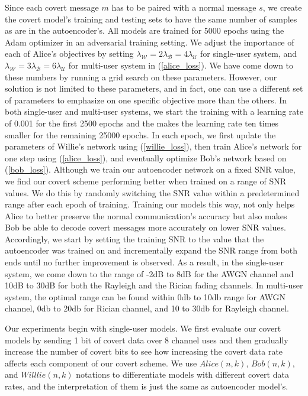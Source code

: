 Since each covert message \(m\) has to be paired with a normal message \(s\), we create the covert model's training and testing sets to have the same number of samples as are in the autoencoder's. All models are trained for 5000 epochs using the Adam optimizer in an adversarial training setting. We adjust the importance of each of Alice's objectives by setting \(\lambda_{\mathcal{W}} = 2 \lambda_{\mathcal{B}} = 4 \lambda_{\mathcal{U}}\) for single-user system, and \(\lambda_{\mathcal{W}} = 3 \lambda_{\mathcal{B}} = 6 \lambda_{\mathcal{U}}\) for multi-user system in (\ref{alice_loss}). We have come down to these numbers by running a grid search on these parameters. However, our solution is not limited to these parameters, and in fact, one can use a different set of parameters to emphasize on one specific objective more than the others. In both single-user and multi-user systems, we start the training with a learning rate of 0.001 for the first 2500 epochs and the makes the learning rate ten times smaller for the remaining 25000 epochs. In each epoch, we first update the parameters of Willie's network using (\ref{willie_loss}), then train Alice's network for one step using (\ref{alice_loss}), and eventually optimize Bob's network based on (\ref{bob_loss}). Although we train our autoencoder network on a fixed SNR value, we find our covert scheme performing better when trained on a range of SNR values. We do this by randomly switching the SNR value within a predetermined range after each epoch of training. Training our models this way, not only helps Alice to better preserve the normal communication's accuracy but also makes Bob be able to decode covert messages more accurately on lower SNR values. Accordingly, we start by setting the training SNR to the value that the autoencoder was trained on and incrementally expand the SNR range from both ends until no further improvement is observed. As a result, in the single-user system, we come down to the range of -2dB to 8dB for the AWGN channel and 10dB to 30dB for both the Rayleigh and the Rician fading channels. In multi-user system, the optimal range can be found within 0db to 10db range for AWGN channel, 0db to 20db for Rician channel, and 10 to 30db for Rayleigh channel.

Our experiments begin with single-user models. We first evaluate our covert models by sending 1 bit of covert data over 8 channel uses and then gradually increase the number of covert bits to see how increasing the covert data rate affects each component of our covert scheme. We use \(Alice (n,k)\), \(Bob (n,k)\), and \(Willlie (n,k)\) notations to differentiate models with different covert data rates, and the interpretation of them is just the same as autoencoder model's. 

